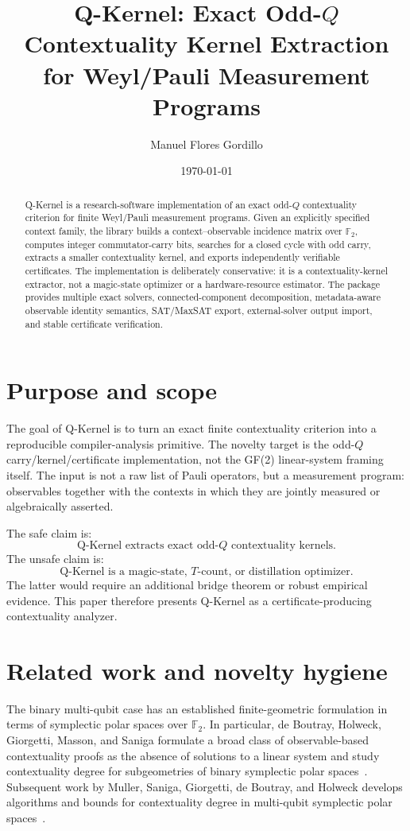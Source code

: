 \documentclass[11pt]{article}
\title{Q-Kernel: Exact Odd-\(Q\) Contextuality Kernel Extraction for Weyl/Pauli Measurement Programs}
\author{Manuel Flores Gordillo}
\date{\today}
\begin{document}
\maketitle

\begin{abstract}
Q-Kernel is a research-software implementation of an exact odd-\(Q\) contextuality criterion for finite Weyl/Pauli measurement programs.  Given an explicitly specified context family, the library builds a context--observable incidence matrix over \(\mathbb{F}_2\), computes integer commutator-carry bits, searches for a closed cycle with odd carry, extracts a smaller contextuality kernel, and exports independently verifiable certificates.  The implementation is deliberately conservative: it is a contextuality-kernel extractor, not a magic-state optimizer or a hardware-resource estimator.  The package provides multiple exact solvers, connected-component decomposition, metadata-aware observable identity semantics, SAT/MaxSAT export, external-solver output import, and stable certificate verification.
\end{abstract}

\section{Purpose and scope}

The goal of Q-Kernel is to turn an exact finite contextuality criterion into a reproducible compiler-analysis primitive.  The novelty target is the odd-\(Q\) carry/kernel/certificate implementation, not the GF(2) linear-system framing itself.  The input is not a raw list of Pauli operators, but a measurement program: observables together with the contexts in which they are jointly measured or algebraically asserted.

The safe claim is:
\[
  \text{Q-Kernel extracts exact odd-}Q\text{ contextuality kernels.}
\]
The unsafe claim is:
\[
  \text{Q-Kernel is a magic-state, }T\text{-count, or distillation optimizer.}
\]
The latter would require an additional bridge theorem or robust empirical evidence.  This paper therefore presents Q-Kernel as a certificate-producing contextuality analyzer.


\section{Related work and novelty hygiene}

The binary multi-qubit case has an established finite-geometric formulation in terms of symplectic polar spaces over \(\mathbb{F}_2\).  In particular, de Boutray, Holweck, Giorgetti, Masson, and Saniga formulate a broad class of observable-based contextuality proofs as the absence of solutions to a linear system and study contextuality degree for subgeometries of binary symplectic polar spaces~\cite{deBoutrayHolweckGiorgettiMassonSaniga2022}.  Subsequent work by Muller, Saniga, Giorgetti, de Boutray, and Holweck develops algorithms and bounds for contextuality degree in multi-qubit symplectic polar spaces~\cite{MullerSanigaGiorgettiDeBoutrayHolweck2023}.
\end{document}
